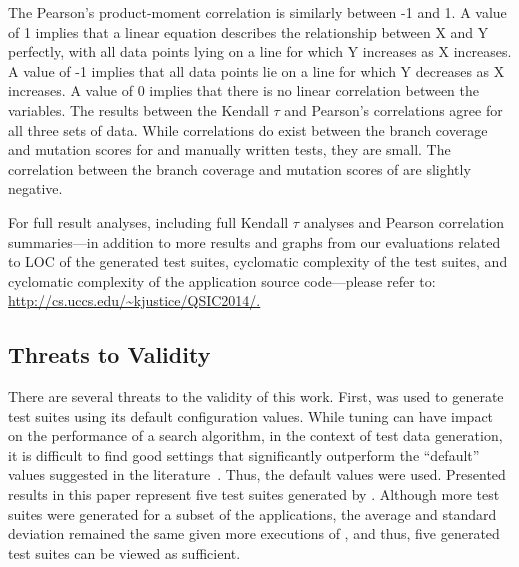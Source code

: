 The Pearson's product-moment correlation is similarly between -1 and 1.  A value of 1 implies that a linear equation
describes the relationship between X and Y perfectly, with all data points lying on a line for which Y increases as X
increases.  A value of -1 implies that all data points lie on a line for which Y decreases as X increases. A value of 0
implies that there is no linear correlation between the variables. The results between the Kendall $\tau$ and Pearson's
correlations agree for all three sets of data.  While correlations do exist between the branch coverage and mutation
scores for \evo and manually written tests, they are small.  The correlation between the branch coverage
and mutation scores of \codepro are slightly negative.  



For full result analyses, including full Kendall $\tau$ analyses and Pearson correlation summaries---in addition to more
results and graphs from our evaluations related to LOC of the generated test suites, cyclomatic complexity of the test
suites, and cyclomatic complexity of the application source code---please refer to: \url{http://cs.uccs.edu/~kjustice/QSIC2014/.}

\subsection{Threats to Validity}

There are several threats to the validity of this work.  First, \evo was used to generate test suites using its default configuration values. While tuning can have impact on the performance of a search algorithm, in the context of test data generation, it is difficult to find good settings that significantly outperform the ``default'' values suggested in the literature~\cite{arcuri2013}.  Thus, the default values were used.  Presented results in this paper represent five test suites generated by \evo.  Although more test suites were generated for a subset of the applications, the average and standard deviation remained the same given more executions of \evo, and thus, five generated test suites can be viewed as sufficient.

